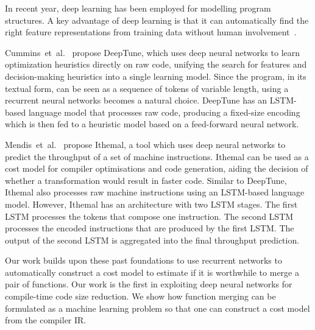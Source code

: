 In recent year, deep learning has been employed for modelling program structures.
A key advantage of deep learning is that it can automatically find the right feature representations from training data without human involvement~\cite{allamanis2018survey}.

Cummins~et~al.~\cite{cummins17} propose DeepTune, which uses deep neural networks to learn optimization heuristics directly on raw code, unifying the search for features and decision-making heuristics into a single learning model.
Since the program, in its textual form, can be seen as a sequence of tokens of variable length, using a recurrent neural networks becomes a natural choice.
DeepTune has an LSTM-based language model that processes raw code, producing a fixed-size encoding which is then fed to a heuristic model based on a feed-forward neural network.

Mendis~et~al.~\cite{mendis19} propose Ithemal, a tool which uses deep neural networks to predict the throughput of a set of machine instructions.
Ithemal can be used as a cost model for compiler optimisations and code generation, aiding the decision of whether a transformation would result in faster code.
Similar to DeepTune, Ithemal also processes raw machine instructions using an LSTM-based language model.
However, Ithemal has an architecture with two LSTM stages.
The first LSTM processes the tokens that compose one instruction.
The second LSTM processes the encoded instructions that are produced by the first LSTM.
The output of the second LSTM is aggregated into the final throughput prediction.

Our work builds upon these past foundations to use recurrent networks to automatically construct a cost model to estimate if it is worthwhile to merge a pair of functions.
Our work is the first in exploiting deep neural networks for compile-time code size reduction.
We show how function merging can be formulated as a machine learning problem so that one can construct a cost model from the compiler IR.
